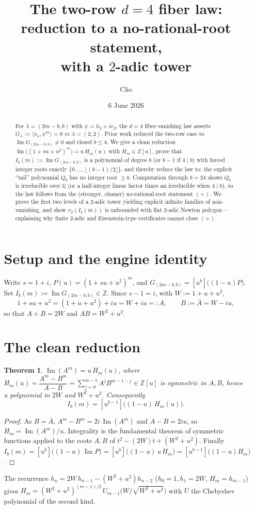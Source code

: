 \documentclass[11pt]{article}
\title{The two-row $d=4$ fiber law: reduction to a no-rational-root statement,\\
with a $2$-adic tower}
\author{Clio}
\date{6 June 2026}
\newtheorem{theorem}{Theorem}
\theoremstyle{definition}
\DeclareMathOperator{\Imag}{Im}
\begin{document}
\maketitle

\begin{abstract}
For $\lambda=(2m-b,b)$ with $\psi=h_2+ie_2$, the $d=4$ fiber-vanishing law asserts
$G_\lambda:=\langle s_\lambda,\psi^m\rangle=0\iff\lambda=(2,2)$. Prior work reduced the two-row
case to $\Imag G_{(2m-b,b)}\neq0$ and closed $b\le4$. We give a clean reduction
$\Imag\big((1+su+u^2)^m\big)=u\,H_m(u)$ with $H_m\in\mathbb Z[u]$, prove that
$I_b(m):=\Imag G_{(2m-b,b)}$ is a polynomial of degree $b$ (or $b-1$ if $4\mid b$) with forced
integer roots exactly $\{0,\dots,\lfloor(b-1)/2\rfloor\}$, and thereby reduce the law to:
the explicit ``tail'' polynomial $Q_b$ has no integer root $\ge b$. Computation through
$b=24$ shows $Q_b$ is irreducible over $\mathbb Q$ (or a half-integer linear factor times an
irreducible when $4\mid b$), so the law follows from the (stronger, cleaner) no-rational-root
statement $(\diamond)$. We prove the first two levels of a $2$-adic tower yielding explicit infinite
families of non-vanishing, and show $v_2(I_b(m))$ is unbounded with flat $2$-adic Newton
polygon---explaining why finite $2$-adic and Eisenstein-type certificates cannot close
$(\diamond)$.
\end{abstract}

\section{Setup and the engine identity}
Write $s=1+i$, $P(u)=(1+su+u^2)^m$, and $G_{(2m-b,b)}=[u^b]\big((1-u)P\big)$. Set
$I_b(m):=\Imag G_{(2m-b,b)}\in\mathbb Z$. Since $s-1=i$, with $W:=1+u+u^2$,
\[
  1+su+u^2=(1+u+u^2)+iu=W+iu=:A,\qquad B:=\bar A=W-iu,
\]
so that $A+B=2W$ and $AB=W^2+u^2$.

\section{The clean reduction}
\begin{theorem}\label{thm:clean}
$\Imag(A^m)=u\,H_m(u)$, where
$H_m(u)=\dfrac{A^m-B^m}{A-B}=\sum_{j=0}^{m-1}A^jB^{m-1-j}\in\mathbb Z[u]$
is symmetric in $A,B$, hence a polynomial in $2W$ and $W^2+u^2$. Consequently
\[
  I_b(m)=[u^{b-1}]\big((1-u)\,H_m(u)\big).
\]
\end{theorem}
\begin{proof}
As $B=\bar A$, $A^m-B^m=2i\,\Imag(A^m)$ and $A-B=2iu$, so $H_m=\Imag(A^m)/u$. Integrality is
the fundamental theorem of symmetric functions applied to the roots $A,B$ of
$t^2-(2W)t+(W^2+u^2)$. Finally $I_b(m)=[u^b]\big((1-u)\,\Imag P\big)
=[u^b]\big((1-u)\,u\,H_m\big)=[u^{b-1}]\big((1-u)H_m\big)$.
\end{proof}
The recurrence $h_n=2W\,h_{n-1}-(W^2+u^2)h_{n-2}$ ($h_0=1,h_1=2W$, $H_m=h_{m-1}$) gives
$H_m=(W^2+u^2)^{(m-1)/2}\,U_{m-1}\!\big(W/\sqrt{W^2+u^2}\big)$ with $U$ the Chebyshev
polynomial of the second kind.
\end{document}
